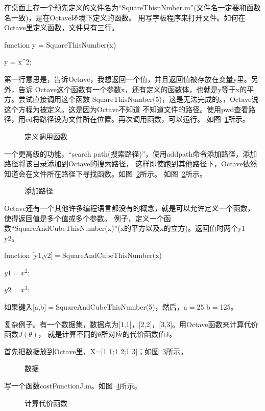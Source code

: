 \documentclass[UTF8]{ctexart}
\begin{document}
在桌面上存一个预先定义的文件名为``SquareThisnNmber.m''(文件名一定要和函数名一致)，是在Octave环境下定义的函数。
用写字板程序来打开文件。如何在Octave里定义函数，文件只有三行。

function y = SquareThisNumber(x)

y = x\^{}2;

第一行意思是，告诉Octave，我想返回一个值，并且返回值被存放在变量y里。另外，告诉
Octave这个函数有一个参数x，还有定义的函数体，也就是y等于x的平方。尝试直接调用这个函数
SquareThisNumber(5)，这是无法完成的。，Octave说这个方程为被定义。这是因为Octave不知道
不知道文件的路径。使用pwd查看路径，用cd将路径设为文件所在位置。再次调用函数，可以运行。
如图~\ref{fig:36}所示。
\begin{figure}[H]
 \caption{定义调用函数}
 \label{fig:36}
\end{figure}

一个更高级的功能，``search path(搜索路径)''，使用addpath命令添加路径，添加路径将该目录添加到Octave的搜索路径，
这样即使跑到其他路径下，Octave依然知道会在文件所在路径下寻找函数。如图~\ref{fig:37}所示。
如图~\ref{fig:37}所示。
\begin{figure}[H]
 \caption{添加路径}
 \label{fig:37}
\end{figure}

Octave还有一个其他许多编程语言都没有的概念，就是可以允许定义一个函数，使得返回值是多个值或多个参数。
例子，定义一个函数``SquareAndCubeThisNumber(x)''(x的平方以及x的立方)。返回值时两个y1 y2。

function [y1,y2]$=$SquareAndCubeThisNumber(x)

$y1=x^2$;

$y2=x^3$;

如果键入[a,b]$=$SquareAndCubeThisNumber(5)，然后，a$=$25 b$=$125。

复杂例子。有一个数据集，数据点为[1,1]，[2,2]，[3,3]。用Octave函数来计算代价函数$J(\theta)$，
就是计算不同的$\theta$所对应的代价函数值J。

首先把数据放到Octave里，X=[1 1;1 2;1 3]；如图~\ref{fig:38}所示。
\begin{figure}[H]
 \caption{数据}
 \label{fig:38}
\end{figure}

写一个函数costFunctionJ.m。如图~\ref{fig:39}所示。
\begin{figure}[H]
 \caption{计算代价函数}
 \label{fig:39}
\end{figure}
\end{document}
